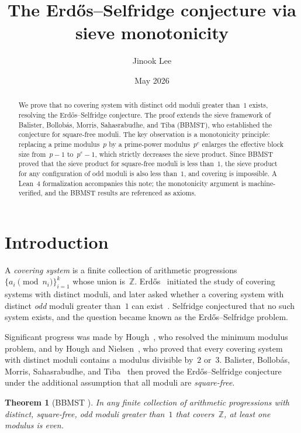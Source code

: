 \documentclass[11pt]{amsart}
\title{The Erd\H{o}s--Selfridge conjecture via sieve monotonicity}
\author{Jinook Lee}
\date{May 2026}
\newtheorem{theorem}{Theorem}[section]
\theoremstyle{definition}
\theoremstyle{remark}
\begin{document}
\begin{abstract}
We prove that no covering system with distinct odd moduli greater than~$1$ exists,
resolving the Erd\H{o}s--Selfridge conjecture.
The proof extends the sieve framework of Balister, Bollob\'as, Morris, Sahasrabudhe,
and Tiba (BBMST), who established the conjecture for square-free moduli.
The key observation is a monotonicity principle: replacing a prime modulus~$p$
by a prime-power modulus~$p^e$ enlarges the effective block size from~$p-1$ to~$p^e-1$,
which strictly decreases the sieve product. Since BBMST proved that the sieve product
for square-free moduli is less than~$1$, the sieve product for any configuration of
odd moduli is also less than~$1$, and covering is impossible.
A Lean~4 formalization accompanies this note; the monotonicity argument is
machine-verified, and the BBMST results are referenced as axioms.
\end{abstract}

\maketitle

\section{Introduction}

A \emph{covering system} is a finite collection of arithmetic progressions
$\{a_i \pmod{n_i}\}_{i=1}^{k}$ whose union is~$\mathbb{Z}$.
Erd\H{o}s~\cite{Erdos1950} initiated the study of covering systems with distinct moduli,
and later asked whether a covering system with distinct \emph{odd} moduli greater than~$1$
can exist~\cite{Erdos1965}.
Selfridge conjectured that no such system exists, and the question became known as the
Erd\H{o}s--Selfridge problem.

Significant progress was made by Hough~\cite{Hough2015}, who resolved the minimum modulus
problem, and by Hough and Nielsen~\cite{HoughNielsen2019}, who proved that every covering
system with distinct moduli contains a modulus divisible by~$2$ or~$3$.
Balister, Bollob\'as, Morris, Sahasrabudhe, and Tiba~\cite{BBMST2019} then proved the
Erd\H{o}s--Selfridge conjecture under the additional assumption that all moduli are
\emph{square-free}.

\begin{theorem}[BBMST {\cite[Theorem~1.1]{BBMST2019}}]\label{thm:bbmst}
In any finite collection of arithmetic progressions with distinct, square-free, odd moduli
greater than~$1$ that covers~$\mathbb{Z}$, at least one modulus is even.
\end{theorem}
\end{document}
